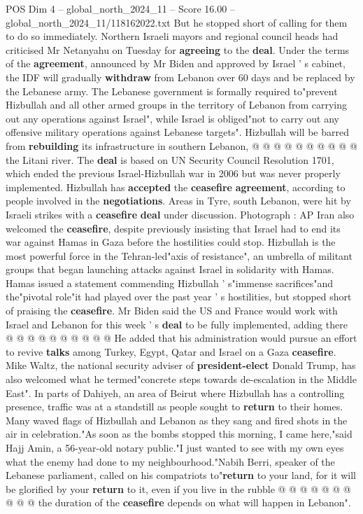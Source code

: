 \begin{textsample}{POS Dim 4 – global\_north\_2024\_11 – Score 16.00 – global\_north\_2024\_11/118162022.txt}
But he stopped short of calling for them to do so immediately.
Northern Israeli mayors and regional council heads had criticised Mr Netanyahu on Tuesday for \textbf{agreeing} to the \textbf{deal}.
Under the terms of the \textbf{agreement}, announced by Mr Biden and approved by Israel ' s cabinet, the IDF will gradually \textbf{withdraw} from Lebanon over 60 days and be replaced by the Lebanese army.
The Lebanese government is formally required to"prevent Hizbullah and all other armed groups in the territory of Lebanon from carrying out any operations against Israel", while Israel is obliged"not to carry out any offensive military operations against Lebanese targets".
Hizbullah will be barred from \textbf{rebuilding} its infrastructure in southern Lebanon, @ @ @ @ @ @ @ @ @ @ the Litani river.
The \textbf{deal} is based on UN Security Council Resolution 1701, which ended the previous Israel-Hizbullah war in 2006 but was never properly implemented.
Hizbullah has \textbf{accepted} the \textbf{ceasefire} \textbf{agreement}, according to people involved in the \textbf{negotiations}.
Areas in Tyre, south Lebanon, were hit by Israeli strikes with a \textbf{ceasefire} \textbf{deal} under discussion.
Photograph : AP Iran also welcomed the \textbf{ceasefire}, despite previously insisting that Israel had to end its war against Hamas in Gaza before the hostilities could stop.
Hizbullah is the most powerful force in the Tehran-led"axis of resistance", an umbrella of militant groups that began launching attacks against Israel in solidarity with Hamas.
Hamas issued a statement commending Hizbullah ' s"immense sacrifices"and the"pivotal role"it had played over the past year ' s hostilities, but stopped short of praising the \textbf{ceasefire}.
Mr Biden said the US and France would work with Israel and Lebanon for this week ' s \textbf{deal} to be fully implemented, adding there @ @ @ @ @ @ @ @ @ @ He added that his administration would pursue an effort to revive \textbf{talks} among Turkey, Egypt, Qatar and Israel on a Gaza \textbf{ceasefire}.
Mike Waltz, the national security adviser of \textbf{president-elect} Donald Trump, has also welcomed what he termed"concrete steps towards de-escalation in the Middle East".
In parts of Dahiyeh, an area of Beirut where Hizbullah has a controlling presence, traffic was at a standstill as people sought to \textbf{return} to their homes.
Many waved flags of Hizbullah and Lebanon as they sang and fired shots in the air in celebration."As soon as the bombs stopped this morning, I came here,"said Hajj Amin, a 56-year-old notary public."I just wanted to see with my own eyes what the enemy had done to my neighbourhood."Nabih Berri, speaker of the Lebanese parliament, called on his compatriots to"\textbf{return} to your land, for it will be glorified by your \textbf{return} to it, even if you live in the rubble @ @ @ @ @ @ @ @ @ @ the duration of the \textbf{ceasefire} depends on what will happen in Lebanon".

\end{textsample}
